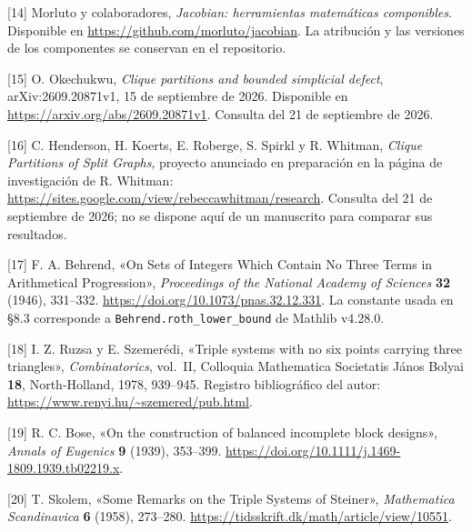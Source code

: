 \documentclass[spanish,11pt,a4paper]{article}
\begin{document}
{[}14{]} Morluto y colaboradores, \emph{Jacobian: herramientas matemáticas componibles}. Disponible en \url{https://github.com/morluto/jacobian}. La atribución y las versiones de los componentes se conservan en el repositorio.

{[}15{]} O. Okechukwu, \emph{Clique partitions and bounded simplicial defect}, arXiv:2609.20871v1, 15 de septiembre de 2026. Disponible en \url{https://arxiv.org/abs/2609.20871v1}. Consulta del 21 de septiembre de 2026.

{[}16{]} C. Henderson, H. Koerts, E. Roberge, S. Spirkl y R. Whitman, \emph{Clique Partitions of Split Graphs}, proyecto anunciado en preparación en la página de investigación de R. Whitman: \url{https://sites.google.com/view/rebeccawhitman/research}. Consulta del 21 de septiembre de 2026; no se dispone aquí de un manuscrito para comparar sus resultados.

{[}17{]} F. A. Behrend, «On Sets of Integers Which Contain No Three Terms in Arithmetical Progression», \emph{Proceedings of the National Academy of Sciences} \textbf{32} (1946), 331--332. \url{https://doi.org/10.1073/pnas.32.12.331}. La constante usada en §8.3 corresponde a \nolinkurl{Behrend.roth_lower_bound} de Mathlib v4.28.0.

{[}18{]} I. Z. Ruzsa y E. Szemerédi, «Triple systems with no six points carrying three triangles», \emph{Combinatorics}, vol.~II, Colloquia Mathematica Societatis János Bolyai \textbf{18}, North-Holland, 1978, 939--945. Registro bibliográfico del autor: \url{https://www.renyi.hu/~szemered/pub.html}.

{[}19{]} R. C. Bose, «On the construction of balanced incomplete block designs», \emph{Annals of Eugenics} \textbf{9} (1939), 353--399. \url{https://doi.org/10.1111/j.1469-1809.1939.tb02219.x}.

{[}20{]} T. Skolem, «Some Remarks on the Triple Systems of Steiner», \emph{Mathematica Scandinavica} \textbf{6} (1958), 273--280. \url{https://tidsskrift.dk/math/article/view/10551}.

\endgroup
\end{document}
